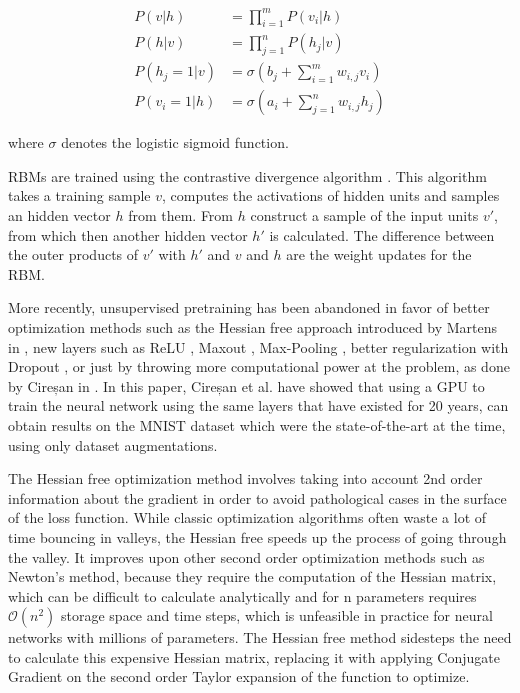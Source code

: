 \begin{align*}
	P(v|h) &= \prod_{i=1}^m P(v_i|h) \\
	P(h|v) &= \prod_{j=1}^n P(h_j|v) \\
	P(h_j=1|v) &= \sigma \left(b_j + \sum_{i=1}^m w_{i,j} v_i \right) \\ 
	P(v_i=1|h) &= \sigma \left(a_i + \sum_{j=1}^n w_{i,j} h_j \right)
\end{align*}

where $ \sigma $ denotes the logistic sigmoid function.

RBMs are trained using the contrastive divergence algorithm \cite{hinton2002training}. This algorithm takes a training sample $ v $, computes the activations of hidden units and samples an hidden vector $h$ from them. From $h$ construct a sample of the input units $ v'$, from which then another hidden vector $ h' $ is calculated. The difference between the outer products of $ v' $ with $ h' $ and $ v $ and $ h $ are the weight updates for the RBM. 

More recently, unsupervised pretraining has been abandoned in favor of better optimization methods such as the Hessian free approach introduced by Martens in \cite{martens2010deep}, new layers such as ReLU \cite{nair2010rectified}, Maxout \cite{goodfellow2013maxout}, Max-Pooling \cite{scherer2010evaluation}, better regularization with Dropout \cite{hinton2012improving}, or just by throwing more computational power at the problem, as done by Cireșan in \cite{Cire_an_2010}. In this paper, Cireșan et al. have showed that using a GPU to train the neural network using the same layers that have existed for 20 years, can obtain results on the MNIST dataset which were the state-of-the-art at the time, using only dataset augmentations. 

The Hessian free optimization method involves taking into account 2nd order information about the gradient in order to avoid pathological cases in the surface of the loss function. While classic optimization algorithms often waste a lot of time bouncing in valleys, the Hessian free speeds up the process of going through the valley. It improves upon other second order optimization methods such as Newton's method, because they require the computation of the Hessian matrix, which can be difficult to calculate analytically and for n parameters requires $ \mathcal{O}(n^2) $ storage space and time steps, which is unfeasible in practice for neural networks with millions of parameters. The Hessian free method sidesteps the need to calculate this expensive Hessian matrix, replacing it with applying Conjugate Gradient on the second order Taylor expansion of the function to optimize. 

